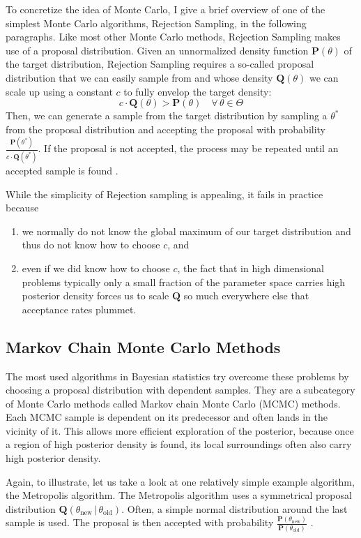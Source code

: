 \documentclass[12pt, a4paper]{report}
\begin{document}
To concretize the idea of Monte Carlo, I give a brief overview of one of the simplest Monte Carlo algorithms, Rejection Sampling, in the following paragraphs.
Like most other Monte Carlo methods, Rejection Sampling makes use of a proposal distribution.
Given an unnormalized density function $\mathbf{P}(\theta)$ of the target distribution, Rejection Sampling requires a so-called proposal distribution that we can easily sample from and whose density $\mathbf{Q}(\theta)$ we can scale up using a constant $c$ to fully envelop the target density:
\begin{equation}
    c \cdot \mathbf{Q}(\theta) > \mathbf{P}(\theta) \quad \forall \, \theta \in \Theta \nonumber
\end{equation}
Then, we can generate a sample from the target distribution by sampling a $\theta^*$ from the proposal distribution and accepting the proposal with probability $\frac{\mathbf{P}(\theta^*)}{c \cdot \mathbf{Q}(\theta^*)}$.
If the proposal is not accepted, the process may be repeated until an accepted sample is found \cite[364]{mckay}.

While the simplicity of Rejection sampling is appealing, it fails in practice because
\begin{enumerate}
    \item we normally do not know the global maximum of our target distribution and thus do not know how to choose $c$, and
    \item even if we did know how to choose $c$, the fact that in high dimensional problems typically only a small fraction of the parameter space carries high posterior density forces us to scale $\mathbf{Q}$ so much everywhere else that acceptance rates plummet.
\end{enumerate}

\subsection{Markov Chain Monte Carlo Methods}
The most used algorithms in Bayesian statistics try overcome these problems by choosing a proposal distribution with dependent samples.
They are a subcategory of Monte Carlo methods called Markov chain Monte Carlo (MCMC) methods.
Each MCMC sample is dependent on its predecessor and often lands in the vicinity of it.
This allows more efficient exploration of the posterior, because once a region of high posterior density is found, its local surroundings often also carry high posterior density. 

Again, to illustrate, let us take a look at one relatively simple example algorithm, the Metropolis algorithm.
The Metropolis algorithm uses a symmetrical proposal distribution $\mathbf{Q}(\theta_{\textrm{new}} \,|\, \theta_{\textrm{old}})$.
Often, a simple normal distribution around the last sample is used.
The proposal is then accepted with probability $\frac{\mathbf{P}(\theta_{\textrm{new}})}{\mathbf{P}(\theta_{\textrm{old}})}$ \cite[p. 365f.]{mckay}.
\end{document}
